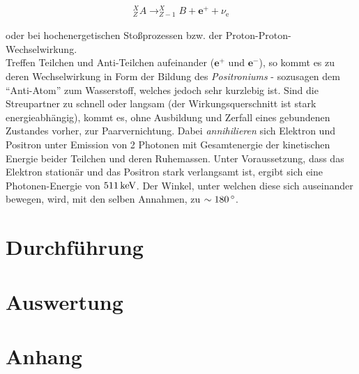 \documentclass[numbers=noenddot,a4paper,notitlepage,twoside,BCOR15mm]{scrartcl}
\newcommand{\degree}{^\circ}
\newcommand{\ix}[1]{_\text{#1}}
\newcommand{\tilt}[1]{\textit{#1}}
\begin{document}
		\begin{align}
			^{X}_{Z}A \rightarrow ^{X}_{Z-1}B+\textbf{e}^{+}+\nu\ix{e}
		\end{align}

		oder bei hochenergetischen Stoßprozessen bzw. der Proton-Proton-Wechselwirkung.\\
		Treffen Teilchen und Anti-Teilchen aufeinander ($\textbf{e}^+$ und $\textbf{e}^-$), so kommt es zu deren Wechselwirkung in Form der Bildung des \tilt{Positroniums} - sozusagen dem "`Anti-Atom"' zum Wasserstoff, welches jedoch sehr kurzlebig ist. Sind die Streupartner zu schnell oder langsam (der Wirkungsquerschnitt ist stark energieabhängig), kommt es, ohne Ausbildung und Zerfall eines gebundenen Zustandes vorher, zur Paarvernichtung. Dabei \tilt{annihilieren} sich Elektron und Positron unter Emission von 2 Photonen mit Gesamtenergie der kinetischen Energie beider Teilchen und deren Ruhemassen. Unter Voraussetzung, dass das Elektron stationär und das Positron stark verlangsamt ist, ergibt sich eine Photonen-Energie von $\unit[511]{keV}$. Der Winkel, unter welchen diese sich auseinander bewegen, wird, mit den selben Annahmen, zu $\sim\unit[180]{\degree}$.

	\newpage
	\section{Durchführung}
	
	\newpage
	\section{Auswertung}
	
	\newpage
	\section{Anhang}

		
		
\end{document}
